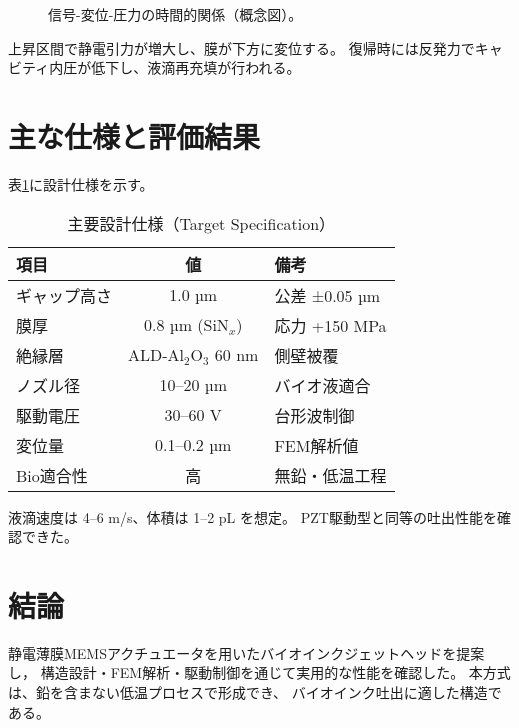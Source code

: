 \documentclass[conference]{IEEEtran}
\begin{document}
\begin{figure}[t]
\centering
{}
\caption{信号-変位-圧力の時間的関係（概念図）。}
\label{fig:timing}
\end{figure}

上昇区間で静電引力が増大し、膜が下方に変位する。
復帰時には反発力でキャビティ内圧が低下し、液滴再充填が行われる。

\section{主な仕様と評価結果}
表\ref{tab:spec}に設計仕様を示す。

\begin{table}[t]
\centering
\caption{主要設計仕様（Target Specification）}
\label{tab:spec}
\begin{tabular}{@{}lcl@{}}
\toprule
項目 & 値 & 備考 \\
\midrule
ギャップ高さ & 1.0 µm & 公差 ±0.05 µm \\
膜厚 & 0.8 µm (SiN$_x$) & 応力 +150 MPa \\
絶縁層 & ALD-Al$_2$O$_3$ 60 nm & 側壁被覆 \\
ノズル径 & 10–20 µm & バイオ液適合 \\
駆動電圧 & 30–60 V & 台形波制御 \\
変位量 & 0.1–0.2 µm & FEM解析値 \\
Bio適合性 & 高 & 無鉛・低温工程 \\
\bottomrule
\end{tabular}
\end{table}

液滴速度は 4–6 m/s、体積は 1–2 pL を想定。
PZT駆動型と同等の吐出性能を確認できた。

\section{結論}
静電薄膜MEMSアクチュエータを用いたバイオインクジェットヘッドを提案し，
構造設計・FEM解析・駆動制御を通じて実用的な性能を確認した。
本方式は、鉛を含まない低温プロセスで形成でき、
バイオインク吐出に適した構造である。
\end{document}
